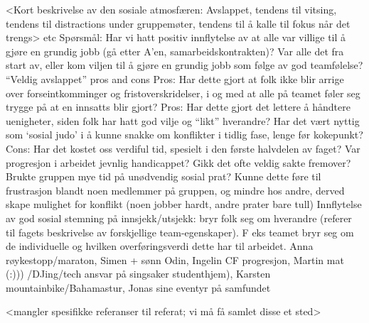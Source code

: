 <Kort beskrivelse av den sosiale atmosfæren: Avslappet, tendens til vitsing, tendens til distractions under gruppemøter, tendens til å kalle til fokus når det trengs>
etc
Spørsmål:
Har vi hatt positiv innflytelse av at alle var villige til å gjøre en grundig jobb (gå etter A’en, samarbeidskontrakten)?
Var alle det fra start av, eller kom viljen til å gjøre en grundig jobb som følge av god teamfølelse?
“Veldig avslappet” pros and cons
Pros: Har dette gjort at folk ikke blir arrige over forseintkomminger og fristoverskridelser, i og med at alle på teamet føler seg trygge på at en innsatts blir gjort? 
Pros: Har dette gjort det lettere å håndtere uenigheter, siden folk har hatt god vilje og “likt” hverandre?
Har det vært nyttig som ‘sosial judo’ i å kunne snakke om konflikter i tidlig fase, lenge før kokepunkt?
Cons: Har det kostet oss verdiful tid, spesielt i den første halvdelen av faget? Var progresjon i arbeidet jevnlig handicappet? Gikk det ofte veldig sakte fremover? Brukte gruppen mye tid på unødvendig sosial prat? Kunne dette føre til frustrasjon blandt noen medlemmer på gruppen, og mindre hos andre, derved skape mulighet for konflikt (noen jobber hardt, andre prater bare tull)
Innflytelse av god sosial stemning på innsjekk/utsjekk: bryr folk seg om hverandre (referer til fagets beskrivelse av forskjellige team-egenskaper). F eks teamet bryr seg om de individuelle og hvilken overføringsverdi dette har til arbeidet.
 Anna røykestopp/maraton, Simen + sønn Odin, Ingelin CF progresjon, Martin mat (:))) /DJing/tech ansvar på singsaker studenthjem), Karsten mountainbike/Bahamastur, Jonas sine eventyr på samfundet 

<mangler spesifikke referanser til referat; vi må få samlet disse et sted>

\fi
